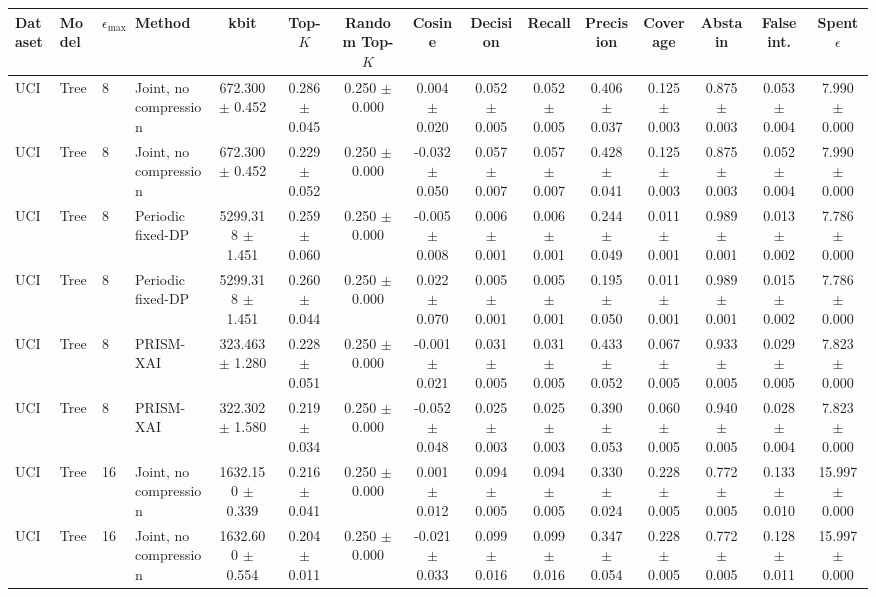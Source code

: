 \begin{tabular}{llllccccccccccc}
\toprule
Dataset & Model & $\epsilon_{\max}$ & Method & kbit & Top-$K$ & Random Top-$K$ & Cosine & Decision & Recall & Precision & Coverage & Abstain & False int. & Spent $\epsilon$ \\
\midrule
UCI & Tree & 8 & Joint, no compression & 672.300 $\pm$ 0.452 & 0.286 $\pm$ 0.045 & 0.250 $\pm$ 0.000 & 0.004 $\pm$ 0.020 & 0.052 $\pm$ 0.005 & 0.052 $\pm$ 0.005 & 0.406 $\pm$ 0.037 & 0.125 $\pm$ 0.003 & 0.875 $\pm$ 0.003 & 0.053 $\pm$ 0.004 & 7.990 $\pm$ 0.000 \\
UCI & Tree & 8 & Joint, no compression & 672.300 $\pm$ 0.452 & 0.229 $\pm$ 0.052 & 0.250 $\pm$ 0.000 & -0.032 $\pm$ 0.050 & 0.057 $\pm$ 0.007 & 0.057 $\pm$ 0.007 & 0.428 $\pm$ 0.041 & 0.125 $\pm$ 0.003 & 0.875 $\pm$ 0.003 & 0.052 $\pm$ 0.004 & 7.990 $\pm$ 0.000 \\
UCI & Tree & 8 & Periodic fixed-DP & 5299.318 $\pm$ 1.451 & 0.259 $\pm$ 0.060 & 0.250 $\pm$ 0.000 & -0.005 $\pm$ 0.008 & 0.006 $\pm$ 0.001 & 0.006 $\pm$ 0.001 & 0.244 $\pm$ 0.049 & 0.011 $\pm$ 0.001 & 0.989 $\pm$ 0.001 & 0.013 $\pm$ 0.002 & 7.786 $\pm$ 0.000 \\
UCI & Tree & 8 & Periodic fixed-DP & 5299.318 $\pm$ 1.451 & 0.260 $\pm$ 0.044 & 0.250 $\pm$ 0.000 & 0.022 $\pm$ 0.070 & 0.005 $\pm$ 0.001 & 0.005 $\pm$ 0.001 & 0.195 $\pm$ 0.050 & 0.011 $\pm$ 0.001 & 0.989 $\pm$ 0.001 & 0.015 $\pm$ 0.002 & 7.786 $\pm$ 0.000 \\
UCI & Tree & 8 & PRISM-XAI & 323.463 $\pm$ 1.280 & 0.228 $\pm$ 0.051 & 0.250 $\pm$ 0.000 & -0.001 $\pm$ 0.021 & 0.031 $\pm$ 0.005 & 0.031 $\pm$ 0.005 & 0.433 $\pm$ 0.052 & 0.067 $\pm$ 0.005 & 0.933 $\pm$ 0.005 & 0.029 $\pm$ 0.005 & 7.823 $\pm$ 0.000 \\
UCI & Tree & 8 & PRISM-XAI & 322.302 $\pm$ 1.580 & 0.219 $\pm$ 0.034 & 0.250 $\pm$ 0.000 & -0.052 $\pm$ 0.048 & 0.025 $\pm$ 0.003 & 0.025 $\pm$ 0.003 & 0.390 $\pm$ 0.053 & 0.060 $\pm$ 0.005 & 0.940 $\pm$ 0.005 & 0.028 $\pm$ 0.004 & 7.823 $\pm$ 0.000 \\
UCI & Tree & 16 & Joint, no compression & 1632.150 $\pm$ 0.339 & 0.216 $\pm$ 0.041 & 0.250 $\pm$ 0.000 & 0.001 $\pm$ 0.012 & 0.094 $\pm$ 0.005 & 0.094 $\pm$ 0.005 & 0.330 $\pm$ 0.024 & 0.228 $\pm$ 0.005 & 0.772 $\pm$ 0.005 & 0.133 $\pm$ 0.010 & 15.997 $\pm$ 0.000 \\
UCI & Tree & 16 & Joint, no compression & 1632.600 $\pm$ 0.554 & 0.204 $\pm$ 0.011 & 0.250 $\pm$ 0.000 & -0.021 $\pm$ 0.033 & 0.099 $\pm$ 0.016 & 0.099 $\pm$ 0.016 & 0.347 $\pm$ 0.054 & 0.228 $\pm$ 0.005 & 0.772 $\pm$ 0.005 & 0.128 $\pm$ 0.011 & 15.997 $\pm$ 0.000 \\

\end{tabular}
